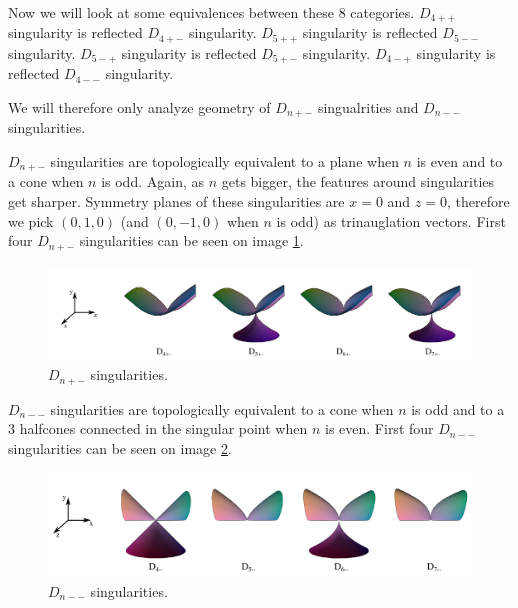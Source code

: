 Now we will look at some equivalences between these 8 categories.
$D_{4++}$ singularity is reflected $D_{4+-}$ singularity.
$D_{5++}$ singularity is reflected $D_{5--}$ singularity.
$D_{5-+}$ singularity is reflected $D_{5+-}$ singularity.
$D_{4-+}$ singularity is reflected $D_{4--}$ singularity.

We will therefore only analyze geometry of $D_{n+-}$ singualrities and
$D_{n--}$ singularities.

$D_{n+-}$ singularities are topologically equivalent to a plane when $n$ is
even and to a cone when $n$ is odd. Again, as $n$ gets bigger, the features
around singularities get sharper. Symmetry planes of these singularities
are $x=0$ and $z=0$, therefore we pick $(0, 1, 0)$ (and $(0, -1, 0)$ when $n$ is odd)
as trinauglation vectors. First four $D_{n+-}$ singularities can be seen on
image \ref{img:7}.

\begin{figure}
    \centerline{\includegraphics[width=1\textwidth]{images/img7}}
    \caption[$D_{n+-}$ singularities]
    {$D_{n+-}$ singularities. \cite{singsurf}}
    \label{img:7}
\end{figure}


$D_{n--}$ singularities are topologically equivalent to a cone when $n$ is
odd and to a 3 halfcones connected in the singular point when $n$ is even.
First four $D_{n--}$ singularities can be seen on image \ref{img:8}.

\begin{figure}
    \centerline{\includegraphics[width=1\textwidth]{images/img8}}
    \caption[$D_{n--}$ singularities]
    {$D_{n--}$ singularities. \cite{singsurf}}
    \label{img:8}
\end{figure}

